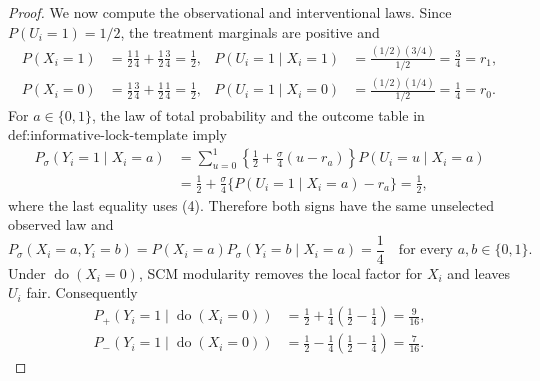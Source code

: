 \documentclass{article}
\begin{document}
\begin{proof}
We now compute the observational and interventional laws.  Since \(P(U_i=1)=1/2\), the treatment marginals are positive and
\[
\begin{aligned}
 P(X_i=1)&=\tfrac12\tfrac14+\tfrac12\tfrac34=\tfrac12,
 &P(U_i=1\mid X_i=1)&=\frac{(1/2)(3/4)}{1/2}=\tfrac34=r_1,\\
 P(X_i=0)&=\tfrac12\tfrac34+\tfrac12\tfrac14=\tfrac12,
 &P(U_i=1\mid X_i=0)&=\frac{(1/2)(1/4)}{1/2}=\tfrac14=r_0.
\end{aligned}                                                     \tag{4}
\]
For \(a\in\{0,1\}\), the law of total probability and the outcome table in \(\text{def:informative-lock-template}\) imply
\[
\begin{aligned}
 P_\sigma(Y_i=1\mid X_i=a)
 &=\sum_{u=0}^1
   \left\{\frac12+\frac{\sigma}{4}(u-r_a)\right\}
   P(U_i=u\mid X_i=a)\\
 &=\frac12+\frac{\sigma}{4}
   \{P(U_i=1\mid X_i=a)-r_a\}=\frac12,                 \tag{5}
\end{aligned}
\]
where the last equality uses (4).  Therefore both signs have the same unselected observed law and
\[
 P_\sigma(X_i=a,Y_i=b)=P(X_i=a)P_\sigma(Y_i=b\mid X_i=a)=\frac14
 \quad\text{for every }a,b\in\{0,1\}.                  \tag{6}
\]
Under \(\operatorname{do}(X_i=0)\), SCM modularity removes the local factor for \(X_i\) and leaves \(U_i\) fair.  Consequently
\[
\begin{aligned}
 P_+(Y_i=1\mid\operatorname{do}(X_i=0))
 &=\frac12+\frac14\left(\frac12-\frac14\right)=\frac9{16},\\
 P_-(Y_i=1\mid\operatorname{do}(X_i=0))
 &=\frac12-\frac14\left(\frac12-\frac14\right)=\frac7{16}. \tag{7}
\end{aligned}
\]


\end{proof}
\end{document}
